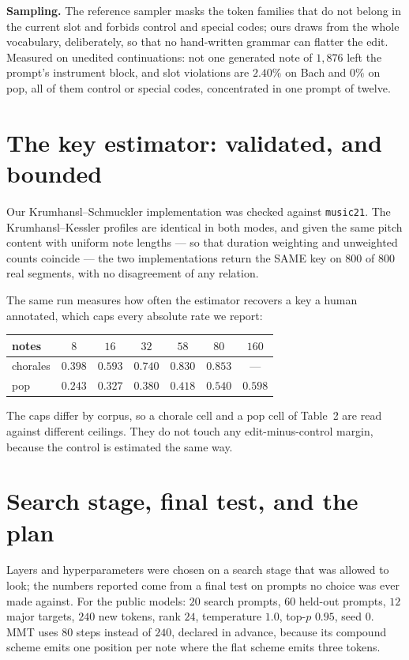 \documentclass{article}
\begin{document}
\textbf{Sampling.} The reference sampler masks the token families that do not belong in
the current slot and forbids control and special codes; ours draws from the whole
vocabulary, deliberately, so that no hand-written grammar can flatter the edit.
Measured on unedited continuations: not one generated note of $1{,}876$ left the
prompt's instrument block, and slot violations are $2.40\%$ on Bach and $0\%$ on pop,
all of them control or special codes, concentrated in one prompt of twelve.

\section{The key estimator: validated, and bounded}

Our Krumhansl--Schmuckler implementation was checked against \texttt{music21}. The
Krumhansl--Kessler profiles are identical in both modes, and given the same pitch
content with uniform note lengths --- so that duration weighting and unweighted counts
coincide --- the two implementations return the SAME key on $800$ of $800$ real
segments, with no disagreement of any relation.

The same run measures how often the estimator recovers a key a human annotated, which
caps every absolute rate we report:

\begin{center}\footnotesize
\begin{tabular}{@{}lcccccc@{}}
\toprule
notes & $8$ & $16$ & $32$ & $58$ & $80$ & $160$\\
\midrule
chorales & $0.398$ & $0.593$ & $0.740$ & $0.830$ & $0.853$ & ---\\
pop      & $0.243$ & $0.327$ & $0.380$ & $0.418$ & $0.540$ & $0.598$\\
\bottomrule
\end{tabular}
\end{center}

The caps differ by corpus, so a chorale cell and a pop cell of Table~2 are read against
different ceilings. They do not touch any edit-minus-control margin, because the
control is estimated the same way.

\section{Search stage, final test, and the plan}

Layers and hyperparameters were chosen on a search stage that was allowed to look; the
numbers reported come from a final test on prompts no choice was ever made against.
For the public models: $20$ search prompts, $60$ held-out prompts, $12$ major targets,
$240$ new tokens, rank $24$, temperature $1.0$, top-$p$ $0.95$, seed $0$. MMT uses
$80$ steps instead of $240$, declared in advance, because its compound scheme emits one
position per note where the flat scheme emits three tokens.
\end{document}
